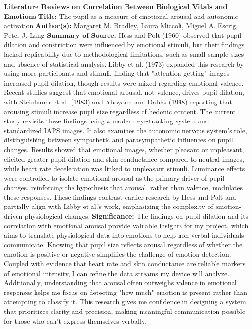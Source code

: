 \documentclass[12pt, research paper]{report}
\begin{document}
	\noindent \textbf{Literature Reviews on Correlation Between Biological Vitals and Emotions}
	\newline \textbf{Title:} The pupil as a measure of emotional arousal and autonomic activation
	\newline \textbf{Author(s):} Margaret M. Bradley, Laura Miccoli, Miguel A. Escrig, Peter J. Lang
	\newline \textbf{Summary of Source:} Hess and Polt (1960) observed that pupil dilation and constriction were influenced by emotional stimuli, but their findings lacked replicability due to methodological limitations, such as small sample sizes and absence of statistical analysis. Libby et al. (1973) expanded this research by using more participants and stimuli, finding that "attention-getting" images increased pupil dilation, though results were mixed regarding emotional valence. Recent studies suggest that emotional arousal, not valence, drives pupil dilation, with Steinhauer et al. (1983) and Aboyoun and Dabbs (1998) reporting that arousing stimuli increase pupil size regardless of hedonic content.
	The current study revisits these findings using a modern eye-tracking system and standardized IAPS images. It also examines the autonomic nervous system's role, distinguishing between sympathetic and parasympathetic influences on pupil changes. Results showed that emotional images, whether pleasant or unpleasant, elicited greater pupil dilation and skin conductance compared to neutral images, while heart rate deceleration was linked to unpleasant stimuli. Luminance effects were controlled to isolate emotional arousal as the primary driver of pupil changes, reinforcing the hypothesis that arousal, rather than valence, modulates these responses. These findings contrast earlier research by Hess and Polt and partially align with Libby et al.'s work, emphasizing the complexity of emotion-driven physiological changes.
	\newline \textbf{Significance:} The findings on pupil dilation and its correlation with emotional arousal provide valuable insights for my project, which aims to translate physiological data into emotions to help non-verbal individuals communicate. Knowing that pupil size reflects arousal regardless of whether the emotion is positive or negative simplifies the challenge of emotion detection. Coupled with evidence that heart rate and skin conductance are reliable markers of emotional intensity, I can refine the data streams my device will analyze. Additionally, understanding that arousal often outweighs valence in emotional responses helps me focus on detecting "how much" emotion is present rather than attempting to classify it. This research gives me confidence in designing a system that prioritizes clarity and precision, making meaningful communication possible for those who can't express themselves verbally.
	\bigskip 
	
\end{document}
